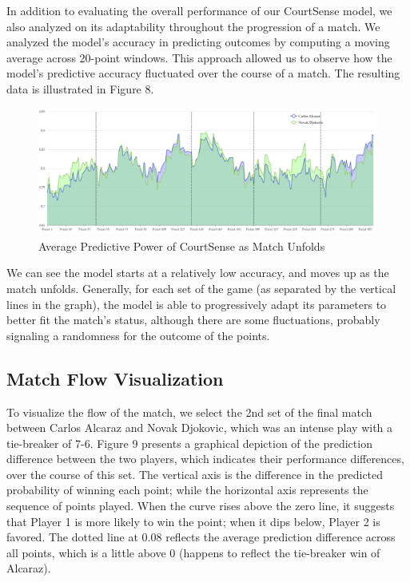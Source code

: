 \documentclass[12pt]{article}  %
\begin{document}
In addition to evaluating the overall performance of our CourtSense model, we also analyzed on its adaptability throughout the progression of a match. We analyzed the model's accuracy in predicting outcomes by computing a moving average across 20-point windows. This approach allowed us to observe how the model's predictive accuracy fluctuated over the course of a match. The resulting data is illustrated in Figure 8. 

\begin{figure}[htbp]  %
	\centering  %
	\includegraphics[width=.8\textwidth]{moving-average.png} %
	\caption{Average Predictive Power of CourtSense as Match Unfolds} %
\end{figure}
\vspace{-0.2cm}

We can see the model starts at a relatively low accuracy, and moves up as the match unfolds. Generally, for each set of the game (as separated by the vertical lines in the graph), the model is able to progressively adapt its parameters to better fit the match's status, although there are some fluctuations, probably signaling a randomness for the outcome of the points.

\subsection{Match Flow Visualization}
To visualize the flow of the match, we select the 2nd set of the final match between Carlos Alcaraz and Novak Djokovic, which was an intense play with a tie-breaker of 7-6. Figure 9 presents a graphical depiction of the prediction difference between the two players, which indicates their performance differences, over the course of this set. The vertical axis is the difference in the predicted probability of winning each point; while the horizontal axis represents the sequence of points played. When the curve rises above the zero line, it suggests that Player 1 is more likely to win the point; when it dips below, Player 2 is favored. The dotted line at 0.08 reflects the average prediction difference across all points, which is a little above 0 (happens to reflect the tie-breaker win of Alcaraz).
\end{document}
